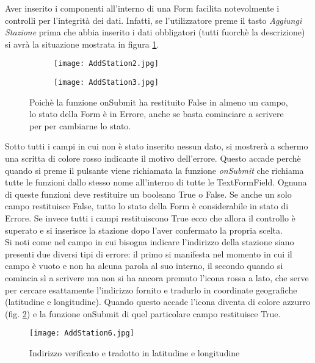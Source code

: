 Aver
inserito i componenti all'interno di una Form facilita notevolmente i controlli
per l'integrità dei dati. Infatti, se l'utilizzatore preme il tasto
\textit{Aggiungi Stazione} prima che abbia inserito i dati obbligatori (tutti
fuorchè la descrizione) si avrà la situazione mostrata in figura \ref{addStation2}.
\begin{figure}[!h]
    \centering
    \begin{subfigure}{0.3\linewidth}
        \texttt{[image: AddStation2.jpg]}
    \end{subfigure}
    \begin{subfigure}{0.3\linewidth}
        \texttt{[image: AddStation3.jpg]}
    \end{subfigure}
    \caption{Poichè la funzione onSubmit ha restituito False in almeno un campo,
    lo stato della Form è in Errore, anche se basta cominciare a scrivere per
    per cambiarne lo stato.}
    \label{addStation2}
\end{figure}
Sotto tutti i campi in cui non è stato inserito nessun dato, si mostrerà a
schermo una scritta di colore rosso indicante il motivo dell'errore. Questo
accade perchè quando si preme il pulsante viene richiamata la funzione
\textit{onSubmit} che richiama tutte le funzioni dallo stesso nome all'interno
di tutte le TextFormField. Ognuna di queste funzioni deve restituire un booleano
True o False. Se anche un solo campo restituisce False, tutto lo stato della
Form è considerabile in stato di Errore. Se invece tutti i campi restituiscono
True ecco che allora il controllo è superato e si inserisce la stazione dopo
l'aver confermato la propria scelta. \\
Si  noti come nel campo in cui bisogna indicare l'indirizzo della stazione siano
presenti due diversi tipi di errore: il primo si manifesta nel momento in cui il
campo è vuoto e non ha alcuna parola al suo interno, il secondo quando si
comincia sì a scrivere ma non si ha ancora premuto l'icona rossa a lato, che
serve per cercare esattamente l'indirizzo fornito e tradurlo in coordinate
geografiche (latitudine e longitudine). Quando questo accade l'icona diventa di
colore azzurro (fig. \ref{addStation6}) e la funzione onSubmit di quel particolare campo
restituisce True.
\begin{figure}[!h]
    \centering
    \texttt{[image: AddStation6.jpg]}
    \caption{Indirizzo verificato e tradotto in latitudine e longitudine}
    \label{addStation6}
\end{figure}  
